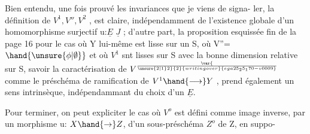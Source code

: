 Bien entendu, une fois prouvé les invariances que je viens de signa-%
ler, la définition de $V^1, V'', V^2$ ,  est claire, indépendamment
de l'existence globale d'un homomorphisme surjectif u:$\underline{E}$ \quad $\underline{J}$ ; d'autre part,
la proposition esquissée fin de la page 16 pour le cas où Y lui-même est
lisse sur un S, où V''= $\hand{\unsure{\phi|\emptyset}}$ et où \hand{,} $V^1$ snt lisses sur S avec la bonne dimension
relative sur S,  savoir la caractérisation de $V^{\var{\over{\unsure{2|1}}{2}}{2}{writing over}{ega25_25_170-v0009}}$ comme le
préschéma de ramification de $V^1 \hand{\longrightarrow} Y$ , prend également un sens intrinsèque,
indépendammant du choix d'un $\underline{E}$.

Pour terminer, on peut expliciter le cas où $V^o$ est défini comme image
inverse, par un morphisme u: $X \hand{\to} Z$, d'un sous-préschéma $Z^o$ de Z, en suppo-%
